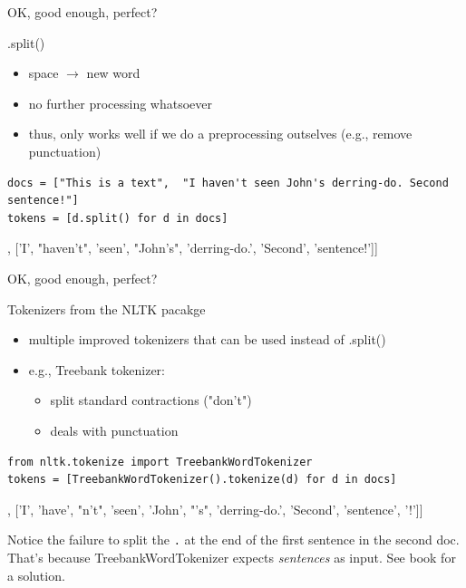 \documentclass[compress]{beamer}
\begin{document}
\begin{frame}[fragile]{OK, good enough, perfect?}
\begin{block}{.split()}
\begin{itemize}
	\item space $\rightarrow$ new word
	\item no further processing whatsoever
	\item thus, only works well if we do a preprocessing outselves (e.g., remove punctuation)
\end{itemize}
\end{block}
\begin{lstlisting}
docs = ["This is a text",  "I haven't seen John's derring-do. Second sentence!"]
tokens = [d.split() for d in docs]
\end{lstlisting}
\begin{lstlistingoutputtiny}
[['This', 'is', 'a', 'text'], ['I', "haven't", 'seen', "John's", 'derring-do.', 'Second', 'sentence!']]
\end{lstlistingoutputtiny}
\end{frame}


\begin{frame}[fragile]{OK, good enough, perfect?}
\begin{block}{Tokenizers from the NLTK pacakge}
\begin{itemize}
\item multiple improved tokenizers that can be used instead of .split()
\item e.g., Treebank tokenizer:
\begin{itemize}
	\item split standard contractions ("don't")
	\item deals with punctuation
\end{itemize}			
\end{itemize}
\end{block}
\begin{lstlisting}
from nltk.tokenize import TreebankWordTokenizer
tokens = [TreebankWordTokenizer().tokenize(d) for d in docs]
\end{lstlisting}
\begin{lstlistingoutputtiny}
[['This', 'is', 'a', 'text'],  ['I', 'have', "n't", 'seen', 'John', "'s", 'derring-do.', 'Second', 'sentence', '!']]
\end{lstlistingoutputtiny}
\tiny{Notice the failure to split the \texttt{.} at the end of the first sentence in the second doc. That's because TreebankWordTokenizer expects \emph{sentences} as input. See book for a solution.\\}
\end{frame}
\end{document}
